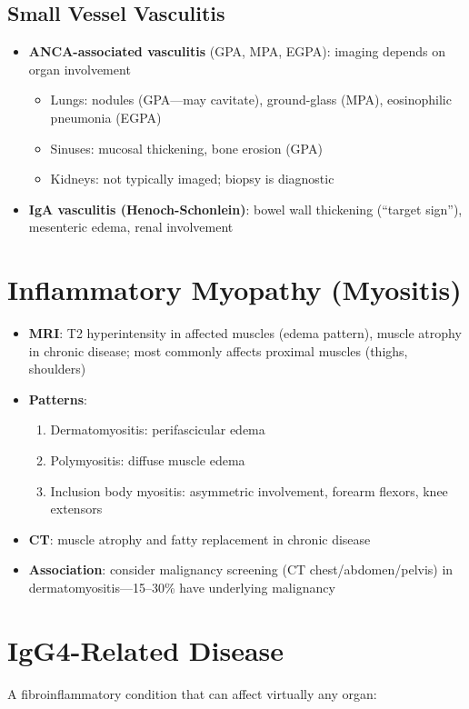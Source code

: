 \subsection{Small Vessel Vasculitis}
\begin{itemize}
  \item \textbf{ANCA-associated vasculitis} (GPA, MPA, EGPA): imaging depends on organ involvement
    \begin{itemize}
      \item Lungs: nodules (GPA---may cavitate), ground-glass (MPA), eosinophilic pneumonia (EGPA)
      \item Sinuses: mucosal thickening, bone erosion (GPA)
      \item Kidneys: not typically imaged; biopsy is diagnostic
    \end{itemize}
  \item \textbf{IgA vasculitis (Henoch-Schonlein)}: bowel wall thickening (``target sign''), mesenteric edema, renal involvement
\end{itemize}

\section{Inflammatory Myopathy (Myositis)}
\begin{itemize}
  \item \textbf{MRI}: T2 hyperintensity in affected muscles (edema pattern), muscle atrophy in chronic disease; most commonly affects proximal muscles (thighs, shoulders)
  \item \textbf{Patterns}:
    \begin{enumerate}
      \item Dermatomyositis: perifascicular edema
      \item Polymyositis: diffuse muscle edema
      \item Inclusion body myositis: asymmetric involvement, forearm flexors, knee extensors
    \end{enumerate}
  \item \textbf{CT}: muscle atrophy and fatty replacement in chronic disease
  \item \textbf{Association}: consider malignancy screening (CT chest/abdomen/pelvis) in dermatomyositis---15--30\% have underlying malignancy
\end{itemize}

\section{IgG4-Related Disease}
A fibroinflammatory condition that can affect virtually any organ:

